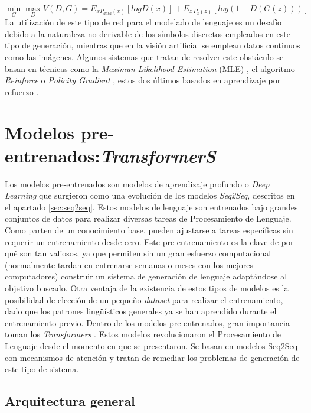 \begin{equation}
	\label{eq:gan_minimax}
	\underset{G}{\min}
	\underset{D}{\max}
	V(D,G) = E_{x P_{data}(x)}[logD(x)] + E_{z~P_{z}(z)}[log(1-D(G(z)))]
\end{equation}
La utilización de este tipo de red para el modelado de lenguaje es un desafío debido a la naturaleza no derivable de los símbolos discretos empleados en este tipo de generación, mientras que en la visión artificial se emplean datos continuos como las imágenes. Algunos sistemas que tratan de resolver este obstáculo se basan en técnicas como la \textit{Maximun Likelihood Estimation} (MLE) \citep{li-etal-2017-adversarial}, el algoritmo \textit{Reinforce} o \textit{Policity Gradient} \citep{Yu2017SeqGANSG}, estos dos últimos basados en aprendizaje por refuerzo \citep{li-etal-2018-paraphrase, Shi2018TowardDT}.


\section{Modelos pre-entrenados:\textit{TransformerS}}
\label{sec:transformers}
Los modelos pre-entrenados son modelos de aprendizaje profundo o \textit{Deep Learning} que surgieron como una evolución de los modelos \textit{Seq2Seq}, descritos en el apartado \ref{sec:seq2seq}. Estos modelos de lenguaje son entrenados bajo grandes conjuntos de datos para realizar diversas tareas de Procesamiento de Lenguaje. Como parten de un conocimiento base, pueden ajustarse a tareas específicas sin requerir un entrenamiento desde cero. Este pre-entrenamiento es la clave de por qué son tan valiosos, ya que permiten sin un gran esfuerzo computacional (normalmente tardan en entrenarse semanas o meses con los mejores computadores) construir un sistema de generación de lenguaje adaptándose al objetivo buscado. Otra ventaja de la existencia de estos tipos de modelos es la posibilidad de elección de un pequeño \textit{dataset} para realizar el entrenamiento, dado que los patrones lingüísticos generales ya se han aprendido durante el entrenamiento previo. Dentro de los modelos pre-entrenados, gran importancia toman los \textit{Transformers} \citep{vaswani2017attention}. Estos modelos revolucionaron el Procesamiento de Lenguaje desde el momento en que se presentaron. Se basan en modelos Seq2Seq con mecanismos de atención y tratan de remediar los problemas de generación de este tipo de sistema.

\subsection{Arquitectura general}

